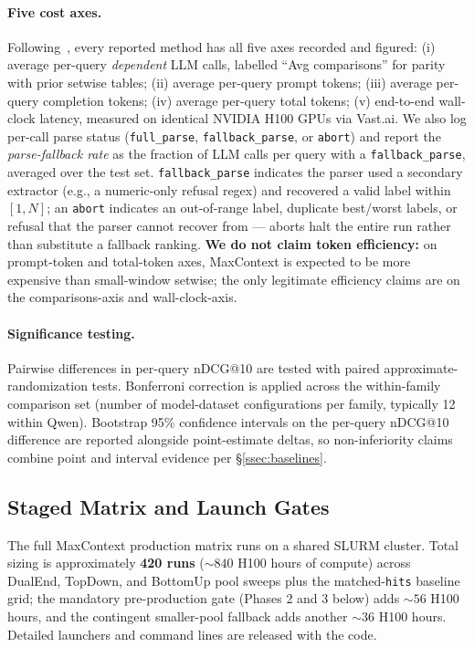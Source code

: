 \paragraph{Five cost axes.}
Following~\citet{peng2025flopsreranking}, every reported method has all
five axes recorded and figured: (i) average per-query \emph{dependent} LLM
calls, labelled ``Avg comparisons'' for parity with prior setwise tables;
(ii) average per-query prompt tokens; (iii) average per-query completion
tokens; (iv) average per-query total tokens; (v) end-to-end wall-clock
latency, measured on identical NVIDIA H100 GPUs via Vast.ai. We also log
per-call parse status (\texttt{full\_parse}, \texttt{fallback\_parse}, or
\texttt{abort}) and report the \emph{parse-fallback rate} as the fraction
of LLM calls per query with a \texttt{fallback\_parse}, averaged over the
test set. \texttt{fallback\_parse} indicates the parser used a secondary
extractor (e.g., a numeric-only refusal regex) and recovered a valid label
within $[1, N]$; an \texttt{abort} indicates an out-of-range label,
duplicate best/worst labels, or refusal that the parser cannot recover from
--- aborts halt the entire run rather than substitute a fallback ranking. \textbf{We do not claim token
efficiency:} on prompt-token and total-token axes, MaxContext is expected
to be more expensive than small-window setwise; the only legitimate
efficiency claims are on the comparisons-axis and wall-clock-axis.

\paragraph{Significance testing.}
Pairwise differences in per-query nDCG@10 are tested with paired
approximate-randomization tests. Bonferroni correction is applied across the
within-family comparison set (number of model-dataset configurations per
family, typically 12 within Qwen). Bootstrap 95\% confidence intervals on
the per-query nDCG@10 difference are reported alongside point-estimate
deltas, so non-inferiority claims combine point and interval evidence per
\S\ref{ssec:baselines}.

\subsection{Staged Matrix and Launch Gates}

The full MaxContext production matrix runs on a shared SLURM cluster. Total
sizing is approximately \textbf{420 runs} ($\sim$$840$ H100 hours of
compute) across DualEnd, TopDown, and BottomUp pool sweeps plus the
matched-\texttt{hits} baseline grid; the mandatory pre-production gate
(Phases 2 and 3 below) adds $\sim$$56$ H100 hours, and the contingent
smaller-pool fallback adds another $\sim$$36$ H100 hours. Detailed launchers
and command lines are released with the code.

